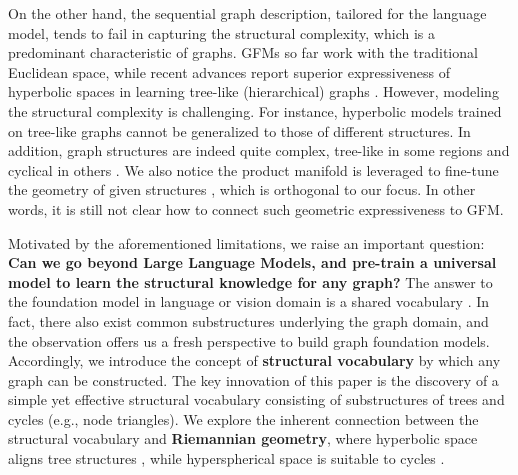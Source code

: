 On the other hand, the sequential graph description, tailored for the language model, tends to fail in capturing the structural complexity, which is a predominant characteristic of graphs.
GFMs so far work with the traditional Euclidean space, while recent advances report superior expressiveness of hyperbolic spaces in learning tree-like (hierarchical) graphs \cite{icml18HierarchiesofHyperbolic,nips19hgcn}.
However, modeling the structural complexity is challenging.
For instance, 
hyperbolic models trained on tree-like graphs cannot be generalized to those of different structures.
In addition, graph structures are indeed quite complex, tree-like in some regions and cyclical in others \cite{iclr19mixCurvature}.
We also notice the product manifold is leveraged to fine-tune  the geometry of given structures \cite{iclr23lantentGraphProduct,aaai22selfMG},  
which is orthogonal to our focus.
In other words,  it is still not clear how to connect such geometric expressiveness to GFM. 


Motivated by the aforementioned limitations, we raise an important question: 
\textbf{Can we go beyond Large Language Models, and pre-train a universal model to learn the structural knowledge for any graph?}
The answer to the foundation model in language or vision domain is a shared vocabulary \cite{chang2024surveyllm}.
In fact, there also exist common substructures underlying the graph domain, 
and the observation offers us a fresh perspective to build graph foundation models.
Accordingly, we introduce the concept of \textbf{structural vocabulary} by which any graph can be constructed.
The key innovation of this paper is the discovery of  a simple yet effective structural vocabulary
consisting of substructures of trees and cycles (e.g., node triangles). 
We  explore the inherent connection between the structural vocabulary and \textbf{Riemannian geometry},
where hyperbolic space aligns  tree structures \cite{nips18hnn,2012lowDistort}, while hyperspherical space is suitable to cycles \cite{iclr19mixCurvature,Petersen16}.

